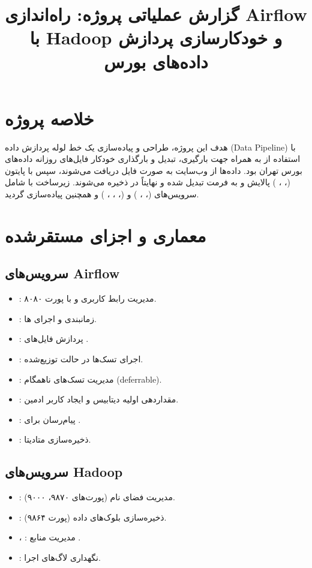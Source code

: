 \documentclass[12pt,a4paper]{article}
\title{گزارش عملیاتی پروژه: راه‌اندازی Airflow با Hadoop و خودکارسازی پردازش داده‌های بورس}
\begin{document}
\maketitle

\section{خلاصه پروژه}
هدف این پروژه، طراحی و پیاده‌سازی یک خط لوله پردازش داده (Data Pipeline) با استفاده از  به همراه  جهت بارگیری، تبدیل و بارگذاری خودکار فایل‌های روزانه داده‌های بورس تهران بود. داده‌ها از وب‌سایت  به صورت فایل  دریافت می‌شوند، سپس با پایتون (، ، ) پالایش و به فرمت  تبدیل شده و نهایتاً در  ذخیره می‌شوند. زیرساخت با  شامل سرویس‌های  (، ، ) و  (، ، ، ) و همچنین  پیاده‌سازی گردید.

\section{معماری و اجزای مستقرشده}
\subsection{سرویس‌های Airflow}
\begin{itemize}
\item {}: مدیریت رابط کاربری و  با پورت ۸۰۸۰.
\item {}: زمانبندی و اجرای ها.
\item {}: پردازش فایل‌های .
\item {}: اجرای تسک‌ها در حالت توزیع‌شده.
\item {}: مدیریت تسک‌های ناهمگام (deferrable).
\item {}: مقداردهی اولیه دیتابیس و ایجاد کاربر ادمین.
\item {}: پیام‌رسان برای .
\item {}: ذخیره‌سازی متادیتا.
\end{itemize}

\subsection{سرویس‌های Hadoop}
\begin{itemize}
\item {}: مدیریت فضای نام  (پورت‌های ۹۸۷۰، ۹۰۰۰).
\item {}: ذخیره‌سازی بلوک‌های داده (پورت ۹۸۶۴).
\item {}، : مدیریت منابع .
\item {}: نگهداری لاگ‌های اجرا.
\end{itemize}
\end{document}
